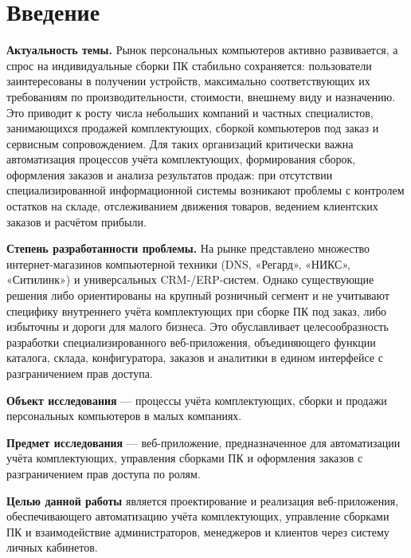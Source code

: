 \section*{Введение}

\textbf{Актуальность темы.} Рынок персональных компьютеров активно развивается, а спрос на индивидуальные сборки ПК стабильно сохраняется: пользователи заинтересованы в получении устройств, максимально соответствующих их требованиям по производительности, стоимости, внешнему виду и назначению. Это приводит к росту числа небольших компаний и частных специалистов, занимающихся продажей комплектующих, сборкой компьютеров под заказ и сервисным сопровождением. Для таких организаций критически важна автоматизация процессов учёта комплектующих, формирования сборок, оформления заказов и анализа результатов продаж: при отсутствии специализированной информационной системы возникают проблемы с контролем остатков на складе, отслеживанием движения товаров, ведением клиентских заказов и расчётом прибыли.

\textbf{Степень разработанности проблемы.} На рынке представлено множество интернет-магазинов компьютерной техники (DNS, «Регард», «НИКС», «Ситилинк») и универсальных CRM-/ERP-систем. Однако существующие решения либо ориентированы на крупный розничный сегмент и не учитывают специфику внутреннего учёта комплектующих при сборке ПК под заказ, либо избыточны и дороги для малого бизнеса. Это обуславливает целесообразность разработки специализированного веб-приложения, объединяющего функции каталога, склада, конфигуратора, заказов и аналитики в едином интерфейсе с разграничением прав доступа.

\textbf{Объект исследования} --- процессы учёта комплектующих, сборки и продажи персональных компьютеров в малых компаниях.

\textbf{Предмет исследования} --- веб-приложение, предназначенное для автоматизации учёта комплектующих, управления сборками ПК и оформления заказов с разграничением прав доступа по ролям.

\textbf{Целью данной работы} является проектирование и реализация веб-приложения, обеспечивающего автоматизацию учёта комплектующих, управление сборками ПК и взаимодействие администраторов, менеджеров и клиентов через систему личных кабинетов.

